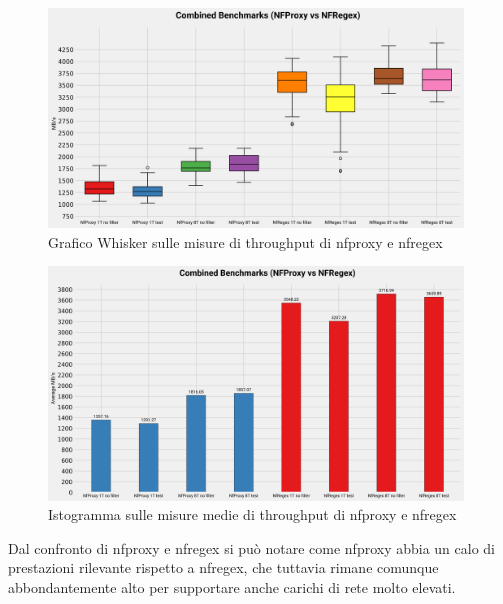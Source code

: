 \begin{figure}[H]
    \centering
    \includegraphics[width=0.98\textwidth]{images/chapter4/whisker_compare.png}
    \caption{Grafico Whisker sulle misure di throughput di nfproxy e nfregex}\label{fig:wisker_nfproxy_nfregex}
\end{figure}

\begin{figure}[H]
    \centering
    \includegraphics[width=0.98\textwidth]{images/chapter4/istrogramma_compare.png}
    \caption{Istogramma sulle misure medie di throughput di nfproxy e nfregex}\label{fig:istogramma_nfproxy_nfregex}
\end{figure}

Dal confronto di nfproxy e nfregex si può notare come nfproxy abbia un calo di prestazioni rilevante rispetto a nfregex, che tuttavia rimane comunque abbondantemente alto per supportare anche carichi di rete molto elevati.\\

